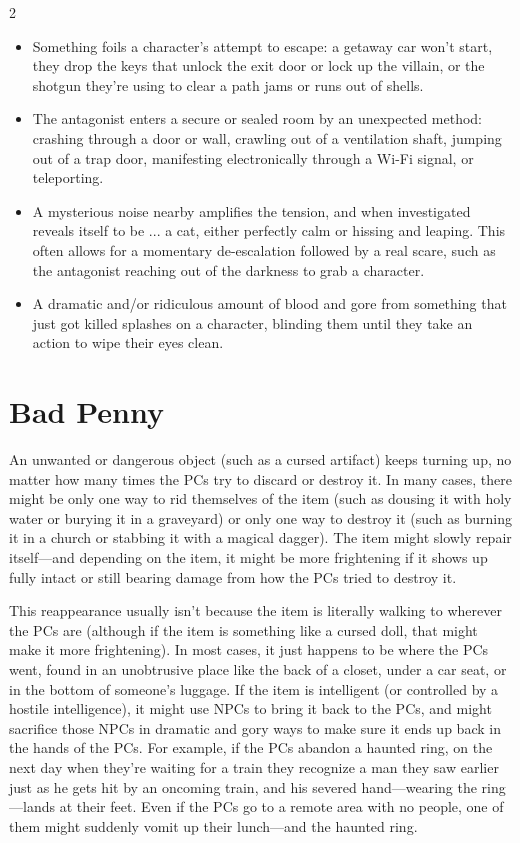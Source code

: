 \begin{multicols}{2}
\begin{itemize}
\item Something foils a character’s attempt to escape: a getaway car won’t start, they drop the keys that unlock the exit door or lock up the villain, or the shotgun they’re using to clear a path jams or runs out of shells.
\item The antagonist enters a secure or sealed room by an unexpected method: crashing through a door or wall, crawling out of a ventilation shaft, jumping out of a trap door, manifesting electronically through a Wi-Fi signal, or teleporting.
\item A mysterious noise nearby amplifies the tension, and when investigated reveals itself to be ... a cat, either perfectly calm or hissing and leaping. This often allows for a momentary de-escalation followed by a real scare, such as the antagonist reaching out of the darkness to grab a character.
\item A dramatic and/or ridiculous amount of blood and gore from something that just got killed splashes on a character, blinding them until they take an action to wipe their eyes clean.
\end{itemize}

\section{Bad Penny}

An unwanted or dangerous object (such as a cursed artifact) keeps turning up, no matter how many times the PCs try to discard or destroy it. In many cases, there might be only one way to rid themselves of the item (such as dousing it with holy water or burying it in a graveyard) or only one way to destroy it (such as burning it in a church or stabbing it with a magical dagger). The item might slowly repair itself—and depending on the item, it might be more frightening if it shows up fully intact or still bearing damage from how the PCs tried to destroy it.

This reappearance usually isn’t because the item is literally walking to wherever the PCs are (although if the item is something like a cursed doll, that might make it more frightening). In most cases, it just happens to be where the PCs went, found in an unobtrusive place like the back of a closet, under a car seat, or in the bottom of someone’s luggage. If the item is intelligent (or controlled by a hostile intelligence), it might use NPCs to bring it back to the PCs, and might sacrifice those NPCs in dramatic and gory ways to make sure it ends up back in the hands of the PCs. For example, if the PCs abandon a haunted ring, on the next day when they’re waiting for a train they recognize a man they saw earlier just as he gets hit by an oncoming train, and his severed hand—wearing the ring—lands at their feet. Even if the PCs go to a remote area with no people, one of them might suddenly vomit up their lunch—and the haunted ring.


\end{multicols}
